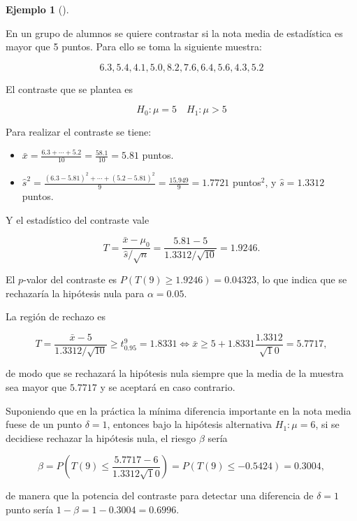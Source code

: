 \documentclass[
  a4paper,
]{scrreport}
\providecommand{\tightlist}{%
  \setlength{\itemsep}{0pt}\setlength{\parskip}{0pt}}\usepackage{longtable,booktabs,array}
\theoremstyle{plain}
\theoremstyle{definition}
\theoremstyle{definition}
\newtheorem{example}{Ejemplo}[chapter]
\theoremstyle{remark}
\begin{document}
\begin{example}[]\protect\hypertarget{exm-contraste-media-normal-varianza-desconocida}{}\label{exm-contraste-media-normal-varianza-desconocida}

En un grupo de alumnos se quiere contrastar si la nota media de
estadística es mayor que 5 puntos. Para ello se toma la siguiente
muestra:

\[
6.3, 5.4, 4.1, 5.0, 8.2, 7.6, 6.4, 5.6, 4.3, 5.2
\]

El contraste que se plantea es

\[H_0: \mu=5 \quad H_1: \mu>5\]

Para realizar el contraste se tiene:

\begin{itemize}
\tightlist
\item
  \(\bar x = \frac{6.3+\cdots+5.2}{10}=\frac{58.1}{10}=5.81\) puntos.
\item
  \(\hat s^2 = \frac{(6.3-5.81)^2+\cdots+(5.2-5.81)^2}{9} = \frac{15.949}{9}=1.7721\)
  puntos\(^2\), y \(\hat s=1.3312\) puntos.
\end{itemize}

Y el estadístico del contraste vale

\[
T=\frac{\bar x-\mu_0}{\hat s/\sqrt{n}} = \frac{5.81-5}{1.3312/\sqrt{10}}= 1.9246.
\]

El \(p\)-valor del contraste es \(P(T(9)\geq 1.9246) = 0.04323\), lo que
indica que se rechazaría la hipótesis nula para \(\alpha=0.05\).

La región de rechazo es

\[
T=\frac{\bar x-5}{1.3312/\sqrt{10}} \geq t^9_{0.95} = 1.8331 \Leftrightarrow \bar x \geq 5+1.8331\frac{1.3312}{\sqrt
10} = 5.7717,
\]

de modo que se rechazará la hipótesis nula siempre que la media de la
muestra sea mayor que \(5.7717\) y se aceptará en caso contrario.

Suponiendo que en la práctica la mínima diferencia importante en la nota
media fuese de un punto \(\delta=1\), entonces bajo la hipótesis
alternativa \(H_1:\mu=6\), si se decidiese rechazar la hipótesis nula,
el riesgo \(\beta\) sería

\[
\beta = P\left(T(9)\leq \frac{5.7717-6}{1.3312\sqrt 10}\right) = P(T(9)\leq -0.5424) = 0.3004,
\]

de manera que la potencia del contraste para detectar una diferencia de
\(\delta=1\) punto sería \(1-\beta=1-0.3004 = 0.6996\).

\end{example}
\end{document}
